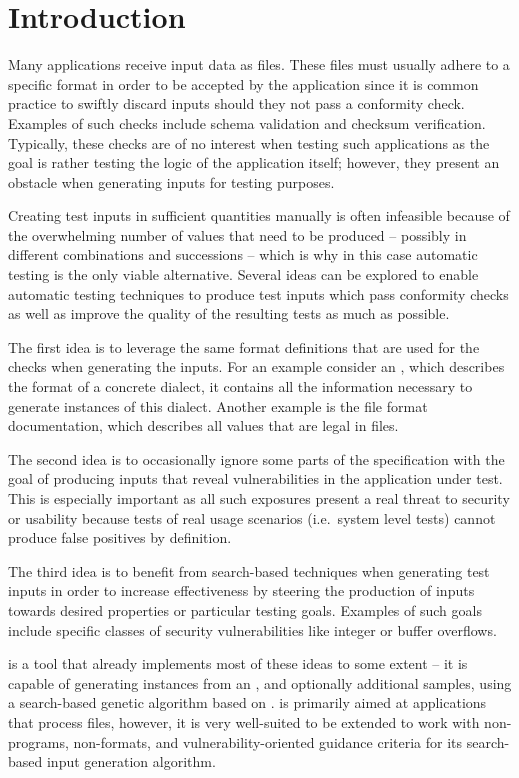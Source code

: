 \section{Introduction}
Many applications receive input data as files. These files must usually adhere to a specific format in order
to be accepted by the application since it is common practice to swiftly discard inputs should they not pass a
conformity check. Examples of such checks include schema validation and checksum verification. Typically, these
checks are of no interest when testing such applications as the goal is rather testing the logic of the
application itself; however, they present an obstacle when generating inputs for
testing purposes.

Creating test inputs in sufficient quantities manually is often infeasible because of the overwhelming number
of values that need to be produced -- possibly in different combinations and successions -- which is why in
this case automatic testing is the only viable alternative. Several ideas can be explored to enable automatic
testing techniques to produce test inputs which pass conformity checks as well as improve the quality of the
resulting tests as much as possible.

The first idea is to leverage the same format definitions that are used for the checks when generating the
inputs. For an example consider an \xsd, which describes the format of a concrete \xml dialect, it contains all
the information necessary to generate instances of this dialect. Another example is the \png file format
documentation, which describes all values that are legal in \png files.

The second idea is to occasionally ignore some parts of the specification with the goal of producing inputs
that reveal vulnerabilities in the application under test. This is especially important as all such exposures
present a real threat to security or usability because tests of real usage scenarios (i.e.\ system level tests)
cannot produce false positives by definition.

The third idea is to benefit from search-based techniques when generating test inputs in order to increase
effectiveness by steering the production of inputs towards desired properties or particular testing goals.
Examples of such goals include specific classes of security vulnerabilities like integer or buffer overflows.

\xmlmate{}\cite{Havrikov:2014:XEX:2635868.2661666} is a tool that already implements most of these ideas to
some extent -- it is capable of generating \xml instances from an \xsd{}, and optionally additional \xml
samples, using a search-based genetic algorithm based on \evosuite{}\cite{fraser2013whole}. \xmlmate is
primarily aimed at \java applications that process \xml files, however, it is very well-suited to be extended
to work with non-\java programs, non-\xml formats, and vulnerability-oriented guidance criteria for its
search-based input generation algorithm.

